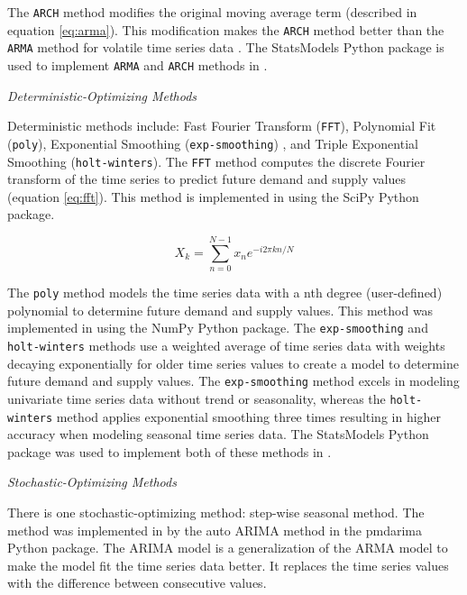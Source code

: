 The \texttt{ARCH} method modifies the original moving 
average term (described in equation \ref{eq:arma}). 
This modification makes the \texttt{ARCH} method 
better than the \texttt{ARMA} method for volatile time 
series data \cite{flanagan_methods_2019}. 
The StatsModels \cite{github_community_statsmodels:_2019}
Python package is used to implement \texttt{ARMA} and 
\texttt{ARCH} methods in \deploy. 

\noindent
\textit{Deterministic-Optimizing Methods}

Deterministic methods include: 
Fast Fourier Transform (\texttt{FFT}), 
Polynomial Fit (\texttt{poly}), 
Exponential Smoothing (\texttt{exp-smoothing})
, and Triple Exponential Smoothing (\texttt{holt-winters}). 
The \texttt{FFT} method computes the discrete Fourier transform 
of the time series to predict future demand and supply 
values (equation \ref{eq:fft}).
This method is implemented in \deploy using the 
SciPy \cite{jones_scipy:_2016} Python package. 

\begin{equation}
	\label{eq:fft}
	X_k = \sum_{n=0}^{N-1}x_n e^{-i2\pi kn/N}
\end{equation}

The \texttt{poly} method models the time series data 
with a nth degree (user-defined) polynomial to determine 
future demand and supply values. 
This method was implemented in \deploy using the 
NumPy \cite{developers_numpy_2013} Python package. 
The \texttt{exp-smoothing} and \texttt{holt-winters} 
methods use a weighted average 
of time series data with weights decaying exponentially 
for older time series values \cite{hyndman_forecasting:_2018}
to create a model to determine future demand and supply values. 
The \texttt{exp-smoothing} method excels in 
modeling univariate time series data without trend or seasonality, 
whereas the \texttt{holt-winters} method applies exponential 
smoothing three times resulting in higher accuracy when 
modeling seasonal time series data. 
The StatsModels \cite{github_community_statsmodels:_2019}
Python package was used to implement both of these methods 
in \deploy. 

\noindent
\textit{Stochastic-Optimizing Methods}

There is one stochastic-optimizing method: step-wise 
seasonal method. 
The method was implemented in \deploy by the auto \gls{ARIMA} 
method in the pmdarima \cite{noauthor_pmdarima:_2019}
Python package. 
The \gls{ARIMA} model is a generalization of the \gls{ARMA}
model to make the model fit the time series data better. 
It replaces the time series values with the difference
between consecutive values. 

